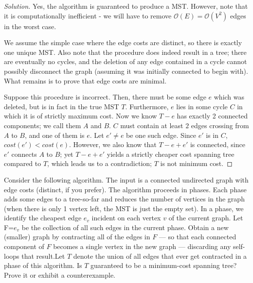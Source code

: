\documentclass[10pt]{article}
\newenvironment{problem}[2][Problem]{\begin{trivlist}
\item[\hskip \labelsep {\bfseries #1}\hskip \labelsep {\bfseries #2.}]}{\end{trivlist}}
\begin{document}
\begin{proof}[Solution]
Yes, the algorithm is guaranteed to produce a MST. However, note that it is computationally inefficient - we will have to remove $\mathcal{O}(E)=\mathcal{O}(V^2)$ edges in the worst case. 

We assume the simple case where the edge costs are distinct, so there is exactly one unique MST. Also note that the procedure does indeed result in a tree; there are eventually no cycles, and the deletion of any edge contained in a cycle cannot possibly disconnect the graph (assuming it was initially connected to begin with). What remains is to prove that edge costs are minimal.

Suppose this procedure is incorrect. Then, there must be some edge $e$ which was deleted, but is in fact in the true MST $T$. Furthermore, $e$ lies in some cycle $C$ in which it is of strictly maximum cost. Now we know $T-e$ has exactly 2 connected components; we call them $A$ and $B$. $C$ must contain at least $2$ edges crossing from $A$ to $B$, and one of them is $e$. Let $e' \neq e$ be one such edge. Since $e'$ is in $C$, $cost(e') < cost(e)$. However, we also know that $T-e+e'$ is connected, since $e'$ connects $A$ to $B$; yet $T-e+e'$ yields a strictly cheaper cost spanning tree compared to $T$, which leads us to a contradiction; $T$ is not minimum cost.
\end{proof}

\begin{problem}{3}
Consider the following algorithm. The input is a connected undirected graph with edge costs (distinct, if you prefer). The algorithm proceeds in phases. Each phase adds some edges to a tree-so-far and reduces the number of vertices in the graph (when there is only 1 vertex left, the MST is just the empty set). In a phase, we identify the cheapest edge $e_v$ incident on each vertex $v$ of the current graph. Let F={$e_v$} be the collection of all such edges in the current phase. Obtain a new (smaller) graph by contracting all of the edges in $F$ --- so that each connected component of $F$ becomes a single vertex in the new graph --- discarding any self-loops that result.Let $T$ denote the union of all edges that ever get contracted in a phase of this algorithm. Is $T$ guaranteed to be a minimum-cost spanning tree? Prove it or exhibit a counterexample.
\end{problem}
\end{document}
